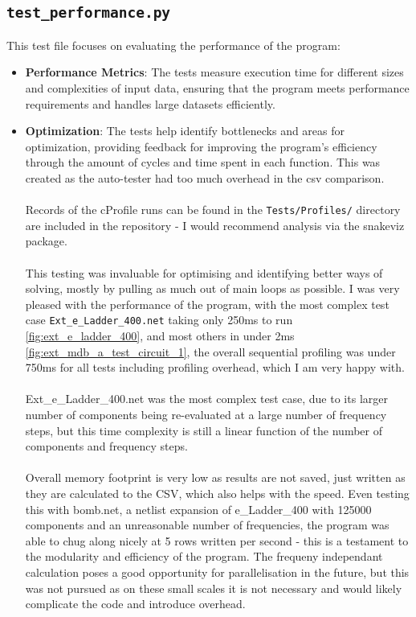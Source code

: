 \documentclass[conference]{IEEEtran}
\begin{document}
\subsection{\textbf{\texttt{test\_performance.py}}}
This test file focuses on evaluating the performance of the program:
\begin{itemize}
      \item \textbf{Performance Metrics}: The tests measure execution time for different sizes and complexities of input data, ensuring that the program meets performance requirements and handles large datasets efficiently.
      \item \textbf{Optimization}: The tests help identify bottlenecks and areas for optimization, providing feedback for improving the program's efficiency through the amount of cycles and time spent in each function.
            This was created as the auto-tester had too much overhead in the csv comparison.
            \\\\
            Records of the cProfile runs can be found in the \texttt{Tests/Profiles/} directory are included in the repository - I would recommend analysis via the snakeviz package.
            \\\\
            This testing was invaluable for optimising and identifying better ways of solving, mostly by pulling as much out of main loops as possible. I was very pleased with the performance of the program,
             with the most complex test case \texttt{Ext\_e\_Ladder\_400.net} taking only 250ms to run \ref{fig:ext_e_ladder_400}, and most others in under 2ms \ref{fig:ext_mdb_a_test_circuit_1}, the overall sequential profiling 
             was under 750ms for all tests including profiling overhead, which I am very happy with.
             \\\\
             Ext\_e\_Ladder\_400.net was the most complex test case, due to its larger number of components being re-evaluated at a large number of frequency steps, but this time complexity is still a linear function of the number of components and frequency steps.
             \\\\
             Overall memory footprint is very low as results are not saved, just written as they are calculated to the CSV, which also helps with the speed. Even testing this with  bomb.net, a netlist expansion of e\_Ladder\_400 with 125000 components and an unreasonable number of frequencies, the program was able to 
             chug along nicely at 5 rows written per second - this is a testament to the modularity and efficiency of the program. The frequeny independant calculation poses a good opportunity for parallelisation in the future, but this was not pursued as on these small scales it is not necessary and would likely complicate
             the code and introduce overhead.
\end{itemize}
\end{document}
